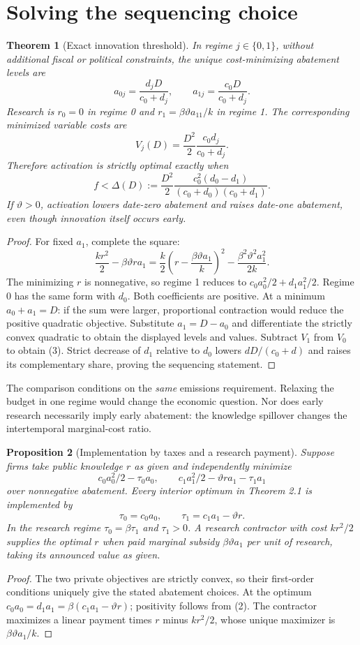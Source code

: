 \documentclass[11pt,a4paper]{article}
\newtheorem{theorem}{Theorem}[section]
\newtheorem{proposition}[theorem]{Proposition}
\theoremstyle{remark}
\begin{document}
\section{Solving the sequencing choice}
\begin{theorem}[Exact innovation threshold]
In regime $j\in\{0,1\}$, without additional fiscal or political constraints, the unique cost-minimizing abatement levels are
\[
 a_{0j}=\frac{d_jD}{c_0+d_j},\qquad
 a_{1j}=\frac{c_0D}{c_0+d_j}.
\]
Research is $r_0=0$ in regime 0 and $r_1=\beta\vartheta a_{11}/k$ in regime 1. The corresponding minimized variable costs are
\[
 V_j(D)=\frac{D^2}{2}\frac{c_0d_j}{c_0+d_j}.
\]
Therefore activation is strictly optimal exactly when
\[
 f<\Delta(D):=\frac{D^2}{2}
 \frac{c_0^2(d_0-d_1)}{(c_0+d_0)(c_0+d_1)}. \tag{3}
\]
If $\vartheta>0$, activation lowers date-zero abatement and raises date-one abatement, even though innovation itself occurs early.
\end{theorem}
\begin{proof}
For fixed $a_1$, complete the square:
\[
 \frac{k r^2}{2}-\beta\vartheta r a_1
 =\frac{k}{2}\left(r-\frac{\beta\vartheta a_1}{k}\right)^2
 -\frac{\beta^2\vartheta^2a_1^2}{2k}.
\]
The minimizing $r$ is nonnegative, so regime 1 reduces to $c_0a_0^2/2+d_1a_1^2/2$. Regime 0 has the same form with $d_0$. Both coefficients are positive. At a minimum $a_0+a_1=D$: if the sum were larger, proportional contraction would reduce the positive quadratic objective. Substitute $a_1=D-a_0$ and differentiate the strictly convex quadratic to obtain the displayed levels and values. Subtract $V_1$ from $V_0$ to obtain (3). Strict decrease of $d_1$ relative to $d_0$ lowers $dD/(c_0+d)$ and raises its complementary share, proving the sequencing statement.
\end{proof}

The comparison conditions on the \emph{same} emissions requirement. Relaxing the budget in one regime would change the economic question. Nor does early research necessarily imply early abatement: the knowledge spillover changes the intertemporal marginal-cost ratio.

\begin{proposition}[Implementation by taxes and a research payment]
Suppose firms take public knowledge $r$ as given and independently minimize
\[
 c_0a_0^2/2-\tau_0a_0,\qquad
 c_1a_1^2/2-\vartheta r a_1-\tau_1a_1
\]
over nonnegative abatement. Every interior optimum in Theorem 2.1 is implemented by
\[
 \tau_0=c_0a_0,\qquad \tau_1=c_1a_1-\vartheta r.
\]
In the research regime $\tau_0=\beta\tau_1$ and $\tau_1>0$. A research contractor with cost $kr^2/2$ supplies the optimal $r$ when paid marginal subsidy $\beta\vartheta a_1$ per unit of research, taking its announced value as given.
\end{proposition}
\begin{proof}
The two private objectives are strictly convex, so their first-order conditions uniquely give the stated abatement choices. At the optimum $c_0a_0=d_1a_1=\beta(c_1a_1-\vartheta r)$; positivity follows from (2). The contractor maximizes a linear payment times $r$ minus $kr^2/2$, whose unique maximizer is $\beta\vartheta a_1/k$.
\end{proof}
\end{document}

